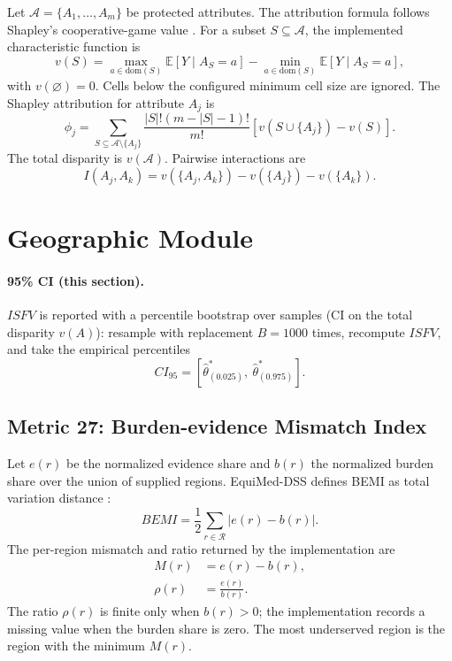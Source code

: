 \documentclass[11pt]{article}
\newcommand{\E}{\mathbb{E}}
\begin{document}
Let $\mathcal{A}=\{A_1,\ldots,A_m\}$ be protected attributes. The attribution
formula follows Shapley's cooperative-game value \cite{shapley1953}. For a
subset $S\subseteq\mathcal{A}$, the implemented characteristic function is
\begin{equation}
v(S)=
\max_{a\in\mathrm{dom}(S)}\E[Y\mid A_S=a]
-
\min_{a\in\mathrm{dom}(S)}\E[Y\mid A_S=a],
\end{equation}
with $v(\varnothing)=0$. Cells below the configured minimum cell size are
ignored. The Shapley attribution for attribute $A_j$ is
\begin{equation}
\phi_j=
\sum_{S\subseteq\mathcal{A}\setminus\{A_j\}}
\frac{|S|!(m-|S|-1)!}{m!}
\left[v(S\cup\{A_j\})-v(S)\right].
\end{equation}
The total disparity is $v(\mathcal{A})$. Pairwise interactions are
\begin{equation}
I(A_j,A_k)=v(\{A_j,A_k\})-v(\{A_j\})-v(\{A_k\}).
\end{equation}

\section{Geographic Module}


\paragraph{95\% CI (this section).} $ISFV$ is reported with a percentile bootstrap over samples (CI on the total disparity $v(A)$): resample with replacement $B=1000$ times, recompute $ISFV$, and take the empirical percentiles
\begin{equation}
CI_{95}=\left[\hat\theta^{\ast}_{(0.025)},\ \hat\theta^{\ast}_{(0.975)}\right].
\end{equation}

\subsection{Metric 27: Burden-evidence Mismatch Index}

Let $e(r)$ be the normalized evidence share and $b(r)$ the normalized burden
share over the union of supplied regions. EquiMed-DSS defines BEMI as total
variation distance \cite{gibbs2002}:
\begin{equation}
BEMI=\frac{1}{2}\sum_{r\in\mathcal{R}}|e(r)-b(r)|.
\end{equation}
The per-region mismatch and ratio returned by the implementation are
\begin{align}
M(r)&=e(r)-b(r),\\
\rho(r)&=\frac{e(r)}{b(r)}.
\end{align}
The ratio $\rho(r)$ is finite only when $b(r)>0$; the implementation records a
missing value when the burden share is zero.
The most underserved region is the region with the minimum $M(r)$.
\end{document}
